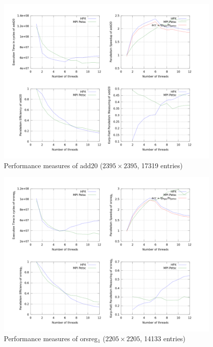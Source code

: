 \documentclass{llncs}
\begin{document}
\begin{figure}[h!]
\begin{center}
\includegraphics[scale=0.25]{Images/add20.png}
\end{center}
\caption{Performance measures of add20 ($2395\times2395$, 17319 entries)}
\label{add20}
\end{figure}

\begin{figure}[h!]
\begin{center}
\includegraphics[scale=0.25]{Images/orsreg1.png}
\end{center}
\caption{Performance measures of orsreg$_1$ ($2205\times2205$, 14133 entries)}
\label{orsreg_1}
\end{figure}
\end{document}
